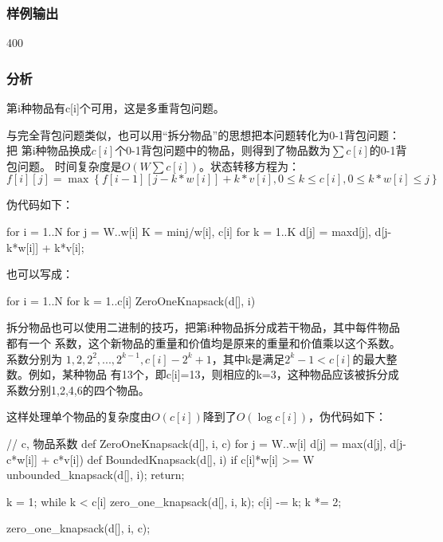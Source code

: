 \subsubsection{样例输出}
\begin{Code}
400
\end{Code}

\subsubsection{分析}
第i种物品有c[i]个可用，这是多重背包问题。

与完全背包问题类似，也可以用“拆分物品”的思想把本问题转化为0-1背包问题：把
第i种物品换成$c[i]$个0-1背包问题中的物品，则得到了物品数为$\sum c[i]$的0-1背包问题。
时间复杂度是$O(W\sum c[i])$。状态转移方程为：
$$f[i][j]=\max\left\{f[i-1][j-k*w[i]]+k*v[i], 0 \leq k \leq c[i], 0 \leq k*w[i] \leq j\right\}$$

伪代码如下：
\begin{Code}
for i = 1..N
    for j = W..w[i]
        K = min{j/w[i], c[i]}
        for k = 1..K
            d[j] = max{d[j], d[j-k*w[i]] + k*v[i]};
\end{Code}

也可以写成：
\begin{Code}
for i = 1..N
    for k = 1..c[i]
        ZeroOneKnapsack(d[], i)
\end{Code}

拆分物品也可以使用二进制的技巧，把第i种物品拆分成若干物品，其中每件物品都有一个
系数，这个新物品的重量和价值均是原来的重量和价值乘以这个系数。系数分别为
$1,2,2^2,...,2^{k-1},c[i]-2^k+1$，其中k是满足$2^k-1<c[i]$的最大整数。例如，某种物品
有13个，即c[i]=13，则相应的k=3，这种物品应该被拆分成系数分别1,2,4,6的四个物品。

这样处理单个物品的复杂度由$O(c[i])$降到了$O(\log c[i])$，伪代码如下：
\begin{Code}
// c, 物品系数
def ZeroOneKnapsack(d[], i, c)
    for j = W..w[i]
        d[j] = max(d[j], d[j-c*w[i]] + c*v[i])
def BoundedKnapsack(d[], i)
    if c[i]*w[i] >= W
        unbounded_knapsack(d[], i);
        return;

    k = 1;
    while k < c[i]
        zero_one_knapsack(d[], i, k);
        c[i] -= k;
        k *= 2;

    zero_one_knapsack(d[], i, c);
\end{Code}

